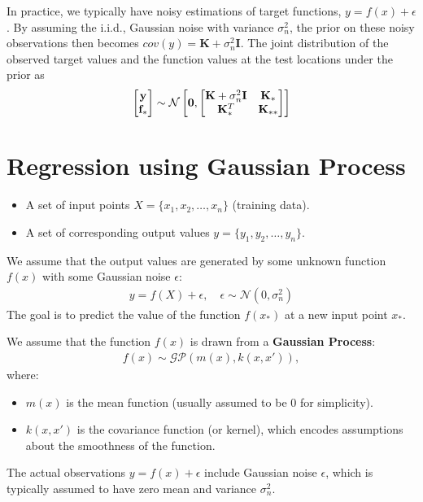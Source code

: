In practice, we typically have noisy estimations of target functions, $y = f(x)+\epsilon$. By assuming the i.i.d., Gaussian noise with variance $\sigma_n^2$, the prior on these noisy observations then becomes $cov(y) = \mathbf{K}+\sigma_n^2\mathbf{I}$. The joint distribution of the observed target values and the function values at the test locations under the prior as 
\begin{align*}
	\begin{bmatrix}
		{\mathbf{y}}\\
		{\mathbf{f}}_*
	\end{bmatrix} \sim \mathcal{N}
	\begin{bmatrix}
		\mathbf{0}, \begin{bmatrix}
			\mathbf{K}+\sigma_n^2\mathbf{I} & \mathbf{K}_*\\
			\mathbf{K}_*^T & \mathbf{K}_{**}
		\end{bmatrix}
	\end{bmatrix}
\end{align*}

\section{Regression using Gaussian Process}
\begin{itemize}
	\item A set of input points $X = \{x_1, x_2, \dots, x_n\}$ (\ie training data).
	\item A set of corresponding output values $y = \{y_1, y_2, \dots, y_n\}$.
\end{itemize}
We assume that the output values are generated by some unknown function $f(x)$ with some Gaussian noise $\epsilon$:
\begin{align*}
	y = f(X) + \epsilon, \quad \epsilon \sim \mathcal{N}(0, \sigma_n^2)
\end{align*}
The goal is to predict the value of the function $f(x_*)$ at a new input point $x_*$.

We assume that the function $f(x)$ is drawn from a \textbf{Gaussian Process}:
\begin{align*}
	f(x) \sim \mathcal{GP}(m(x), k(x, x')),
\end{align*}
where:
\begin{itemize}
	\item $m(x)$ is the mean function (usually assumed to be 0 for simplicity).
	\item $k(x, x')$ is the covariance function (or kernel), which encodes assumptions about the smoothness of the function.
\end{itemize}
The actual observations $y = f(x) + \epsilon$ include Gaussian noise $\epsilon$, which is typically assumed to have zero mean and variance \( \sigma_n^2 \).

